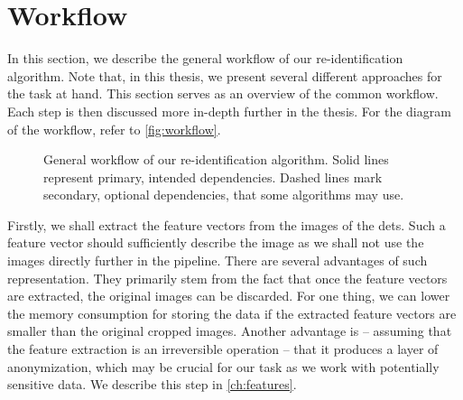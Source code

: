 






\section{Workflow}

\label{sec:workflow}


In this section, we describe the general workflow of our re-identification algorithm. Note that, in this thesis, we present several different approaches for the task at hand. This section serves as an overview of the common workflow. Each step is then discussed more in-depth further in the thesis. For the diagram of the workflow, refer to \autoref{fig:workflow}.

\begin{figure}
    \centering
    \def\svgwidth{\textwidth}
    
    \caption[General workflow of our re-identification algorithm]{General workflow of our re-identification algorithm. Solid lines represent primary, intended dependencies.
    Dashed lines mark secondary, optional dependencies, that some algorithms may use.}
    \label{fig:workflow}
\end{figure}

Firstly, we shall extract the feature vectors from the images of the \glspl{det}. Such a feature vector should sufficiently describe the image as we shall not use the images directly further in the pipeline. There are several advantages of such representation. They primarily stem from the fact that once the feature vectors are extracted, the original images can be discarded. For one thing, we can lower the memory consumption for storing the data if the extracted feature vectors are smaller than the original cropped images. Another advantage is -- assuming that the feature extraction is an irreversible operation -- that it produces a layer of anonymization, which may be crucial for our task as we work with potentially sensitive data. We describe this step in \autoref{ch:features}.

